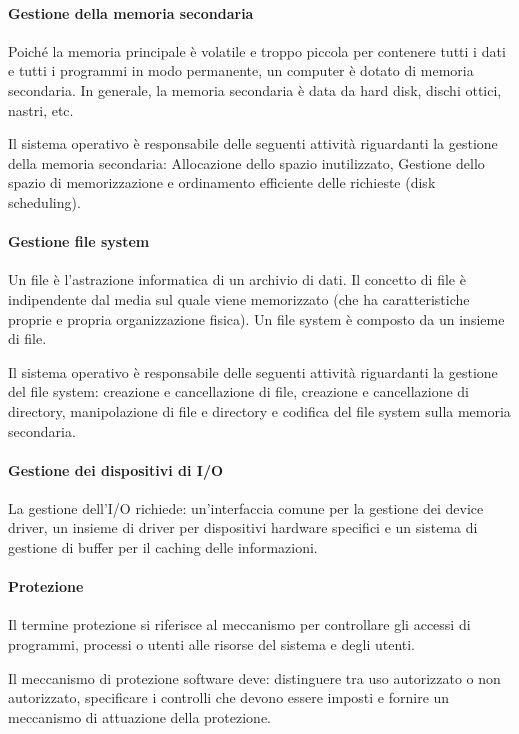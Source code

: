 \paragraph{Gestione della memoria secondaria}
Poiché la memoria principale è volatile e troppo piccola per contenere tutti i dati e tutti i programmi in modo permanente, un computer è dotato di memoria secondaria.
In generale, la memoria secondaria è data da hard disk, dischi ottici, nastri, etc.

Il sistema operativo è responsabile delle seguenti attività
riguardanti la gestione della memoria secondaria: Allocazione dello spazio inutilizzato, Gestione dello spazio di memorizzazione e ordinamento efficiente delle richieste (disk scheduling).

\paragraph{Gestione file system}
Un file è l'astrazione informatica di un archivio di dati.
Il concetto di file è indipendente dal media sul quale viene
memorizzato (che ha caratteristiche proprie e propria organizzazione fisica). Un file system è composto da un insieme di file. 

Il sistema operativo è responsabile delle seguenti attività
riguardanti la gestione del file system: creazione e cancellazione di file, creazione e cancellazione di directory, manipolazione di file e directory e codifica del file system sulla memoria secondaria.

\paragraph{Gestione dei dispositivi di I/O}
La gestione dell’I/O richiede: un’interfaccia comune per la gestione dei device driver, un insieme di driver per dispositivi hardware specifici e un sistema di gestione di buffer per il caching delle informazioni.

\paragraph{Protezione}
Il termine protezione si riferisce al meccanismo per controllare gli accessi di programmi, processi o utenti alle risorse del sistema e degli utenti.

Il meccanismo di protezione software deve: distinguere tra uso autorizzato o non autorizzato, specificare i controlli che devono essere imposti e fornire un meccanismo di attuazione della protezione.

